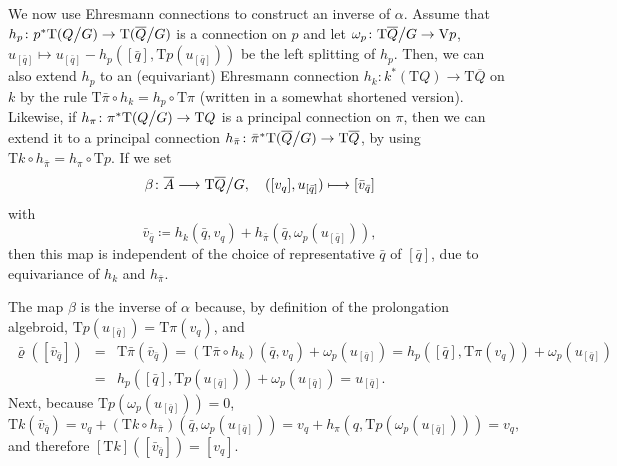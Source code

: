 \documentclass[11pt]{article}
\theoremstyle{plain}
\theoremstyle{definition}
\begin{document}
We now use Ehresmann connections to construct an inverse of $\alpha$. Assume that $h_p\colon p^{\ast} \mathrm{T}(Q\big\slash G) \to \mathrm{T}(\overline Q\big\slash G )$ is a connection on $p$ and let $\omega_p\colon \mathrm{T}{\overline Q}\big\slash G \to \mathrm{V}p$, $u_{[\bar q]} \mapsto u_{[\bar q]} - h_p([\bar q], \mathrm{T}p(u_{[\bar q]}))$ be the left splitting of $h_p$. Then,   we can also extend $h_p$ to an (equivariant) Ehresmann connection $h_k\colon k^{\ast} (\mathrm{T}{Q}) \to \mathrm{T}\overline{Q}$ on $k$ by the rule $\mathrm{T}\bar\pi\circ h_k = h_p \circ \mathrm{T}\pi$ (written in a somewhat shortened version). Likewise, if $h_\pi\colon \pi^{\ast} \mathrm{T}(Q\big\slash G) \to \mathrm{T}Q$ is a principal connection on $\pi$, then we can extend it to a principal connection $h_{\bar\pi}\colon {\bar\pi}^{\ast} \mathrm{T}(\overline Q\big\slash G) \to \mathrm{T}\overline Q$, by using $\mathrm{T}k\circ h_{\bar\pi} = h_\pi \circ \mathrm{T}p$.
If we set
\begin{equation*}
    \beta\colon  \overline A \longrightarrow \mathrm{T}\overline{Q}\big\slash G,\quad ( [v_q] , u_{[\bar q]}) \longmapsto [{\bar v}_{\bar q}]
\end{equation*}
with
\begin{equation*}
    {\bar v}_{\bar q}\coloneqq h_k(\bar q, v_q  ) + h_{\bar\pi}(\bar q,\omega_p(u_{[\bar q]})),
\end{equation*}
then this map is independent of the choice of representative $\bar{q}$ of $[\bar q]$, due to equivariance of $h_k$ and $h_{\bar{\pi}}$.

The map $\beta$ is the inverse of $\alpha$ because, by definition of the prolongation algebroid, $\mathrm{T}p (u_{[\bar q]}) = \mathrm{T}\pi(v_q)$, and
\begin{eqnarray*}
\bar\varrho([{\bar v}_{\bar q}]) &=& \mathrm{T}\bar\pi({\bar v}_{\bar q}) =   (\mathrm{T}\bar\pi\circ h_k)(\bar q, v_q) + \omega_p(u_{[\bar q]})  = h_p([\bar q], \mathrm{T}\pi(v_q)) +   \omega_p(u_{[\bar q]})\\& =&  h_p([\bar q], \mathrm{T}p(u_{[\bar q]})) +   \omega_p(u_{[\bar q]}) = u_{[\bar q]}.
\end{eqnarray*}
Next, because $\mathrm{T}p(\omega_p(u_{[\bar q]}))=0$,
\begin{equation*}
    \mathrm{T}k({\bar v}_{\bar q}) = v_q + (\mathrm{T}k \circ h_{\bar\pi})(\bar q,\omega_p(u_{[\bar q]})) = v_q +  h_{\pi}(  q,  \mathrm{T}p(\omega_p(u_{[\bar q]}))) =  v_q,
\end{equation*}
and therefore $[\mathrm{T}k]([{\bar v}_{\bar q}]) =  [v_q]$.
\end{document}
